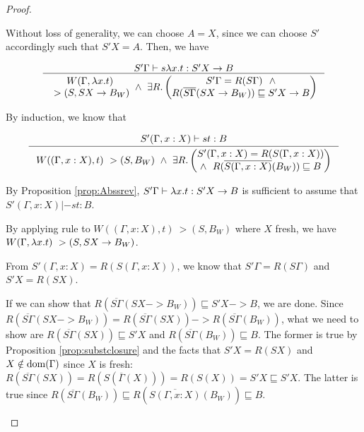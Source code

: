 \begin{proof}
\begin{itemize}
        Without loss of generality, we can choose $A = X$,
        since we can choose $S'$ accordingly such that $S'X = A$.
        Then, we have \vspace*{-2em}
        \begin{singlespace}
        \[\inference{S'\Gamma |-s \l x.t : S'X -> B}{
        \begin{matrix} W(\Gamma,\l x.t) \\ ~> (S,S X -> B_W) \end{matrix}
        ~\land~
        \exists R.
                \left(\begin{matrix}
                        S'\Gamma=R(S\Gamma) ~~ \land \\
                        R(\overline{S\Gamma}(SX -> B_W))\sqsubseteq S'X -> B
                \end{matrix}\right) } \]
        \end{singlespace}

        By induction, we know that  \vspace*{-2em}
        \begin{singlespace}
        \[\inference{S'(\Gamma,x:X) |-s t : B}{
        W((\Gamma, x:X),t) ~> (S,B_W) ~\land~
        \exists R.
                \left(\begin{matrix}
                        S'(\Gamma,x:X)=R(S(\Gamma,x:X)) \\ \land~\;
                        R(\overline{S(\Gamma,x:X)}(B_W))\sqsubseteq B
                \end{matrix}\right) } \]
        \end{singlespace}

        By Proposition \ref{prop:Abssrev},
        $S'\Gamma |- \lambda x.t : S'X -> B$ is sufficient to assume that
        $S'(\Gamma,x:X) |-s t:B$.

        By applying  rule to
        $W((\Gamma, x:X),t) ~> (S,B_W)$ where $X$ fresh,
        we have $W(\Gamma,\lambda x.t) ~> (S,S X -> B_W)$.

        From $S'(\Gamma,x:X)=R(S(\Gamma,x:X))$, we know that
        $S'\Gamma = R(S\Gamma)$ and $S'X = R(S X)$.

        If we can show that
        $R(\overline{S\Gamma}(S X -> B_W)) \sqsubseteq S'X -> B$,
        we are done. Since
        $R(\overline{S\Gamma}(S X -> B_W)) =
        R(\overline{S\Gamma}(S X)) -> R(\overline{S\Gamma}(B_W))$,
        what we need to show are
        $R(\overline{S\Gamma}(S X))\sqsubseteq S'X$ and
        $R(\overline{S\Gamma}(B_W)) \sqsubseteq B$.
        The former is true by Proposition \ref{prop:substclosure} and
        the facts that $S'X = R(S X)$ and
        $X\notin \mathop{\mathrm{dom}}(\Gamma)$ since $X$ is fresh:
        $R(\overline{S\Gamma}(S X)) =
        R(S(\overline{\Gamma}(X))) = R(S(X)) = S'X
        \sqsubseteq S' X$.
        The latter is true since $ R(\overline{S\Gamma}(B_W)) 
        \sqsubseteq R(\overline{S(\Gamma,x:X)}(B_W)) \sqsubseteq B$.


\end{itemize}
\end{proof}
